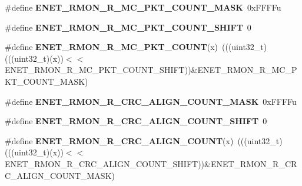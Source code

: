 \begin{DoxyCompactItemize}
\item 
\#define {\bfseries E\+N\+E\+T\+\_\+\+R\+M\+O\+N\+\_\+\+R\+\_\+\+M\+C\+\_\+\+P\+K\+T\+\_\+\+C\+O\+U\+N\+T\+\_\+\+M\+A\+SK}~0x\+F\+F\+F\+Fu\hypertarget{group__ENET__Register__Masks_gaffc93969b103038343e11847c1dd49f0}{}\label{group__ENET__Register__Masks_gaffc93969b103038343e11847c1dd49f0}

\item 
\#define {\bfseries E\+N\+E\+T\+\_\+\+R\+M\+O\+N\+\_\+\+R\+\_\+\+M\+C\+\_\+\+P\+K\+T\+\_\+\+C\+O\+U\+N\+T\+\_\+\+S\+H\+I\+FT}~0\hypertarget{group__ENET__Register__Masks_ga2bd574ecd5d63b6c391f9db9c33a22f6}{}\label{group__ENET__Register__Masks_ga2bd574ecd5d63b6c391f9db9c33a22f6}

\item 
\#define {\bfseries E\+N\+E\+T\+\_\+\+R\+M\+O\+N\+\_\+\+R\+\_\+\+M\+C\+\_\+\+P\+K\+T\+\_\+\+C\+O\+U\+NT}(x)~(((uint32\+\_\+t)(((uint32\+\_\+t)(x))$<$$<$E\+N\+E\+T\+\_\+\+R\+M\+O\+N\+\_\+\+R\+\_\+\+M\+C\+\_\+\+P\+K\+T\+\_\+\+C\+O\+U\+N\+T\+\_\+\+S\+H\+I\+FT))\&E\+N\+E\+T\+\_\+\+R\+M\+O\+N\+\_\+\+R\+\_\+\+M\+C\+\_\+\+P\+K\+T\+\_\+\+C\+O\+U\+N\+T\+\_\+\+M\+A\+SK)\hypertarget{group__ENET__Register__Masks_ga8407d8b93947fd3cb51d75cbc605c48d}{}\label{group__ENET__Register__Masks_ga8407d8b93947fd3cb51d75cbc605c48d}

\item 
\#define {\bfseries E\+N\+E\+T\+\_\+\+R\+M\+O\+N\+\_\+\+R\+\_\+\+C\+R\+C\+\_\+\+A\+L\+I\+G\+N\+\_\+\+C\+O\+U\+N\+T\+\_\+\+M\+A\+SK}~0x\+F\+F\+F\+Fu\hypertarget{group__ENET__Register__Masks_ga281a3f038fe24ee481f4b620968e402f}{}\label{group__ENET__Register__Masks_ga281a3f038fe24ee481f4b620968e402f}

\item 
\#define {\bfseries E\+N\+E\+T\+\_\+\+R\+M\+O\+N\+\_\+\+R\+\_\+\+C\+R\+C\+\_\+\+A\+L\+I\+G\+N\+\_\+\+C\+O\+U\+N\+T\+\_\+\+S\+H\+I\+FT}~0\hypertarget{group__ENET__Register__Masks_gade379ca6709a28dd3014b9c0062145de}{}\label{group__ENET__Register__Masks_gade379ca6709a28dd3014b9c0062145de}

\item 
\#define {\bfseries E\+N\+E\+T\+\_\+\+R\+M\+O\+N\+\_\+\+R\+\_\+\+C\+R\+C\+\_\+\+A\+L\+I\+G\+N\+\_\+\+C\+O\+U\+NT}(x)~(((uint32\+\_\+t)(((uint32\+\_\+t)(x))$<$$<$E\+N\+E\+T\+\_\+\+R\+M\+O\+N\+\_\+\+R\+\_\+\+C\+R\+C\+\_\+\+A\+L\+I\+G\+N\+\_\+\+C\+O\+U\+N\+T\+\_\+\+S\+H\+I\+FT))\&E\+N\+E\+T\+\_\+\+R\+M\+O\+N\+\_\+\+R\+\_\+\+C\+R\+C\+\_\+\+A\+L\+I\+G\+N\+\_\+\+C\+O\+U\+N\+T\+\_\+\+M\+A\+SK)\hypertarget{group__ENET__Register__Masks_ga7ae15afbb7439b8f9879f90331f3679e}{}\label{group__ENET__Register__Masks_ga7ae15afbb7439b8f9879f90331f3679e}


\end{DoxyCompactItemize}
